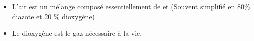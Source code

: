 \begin{mybilan}
	\begin{itemize}
		\item L'air est un mélange composé essentiellement de  et  (Souvent simplifié en 80\% diazote et 20 \% dioxygène)
		\item Le dioxygène est le gaz nécessaire à la vie.
	\end{itemize}
\end{mybilan}
